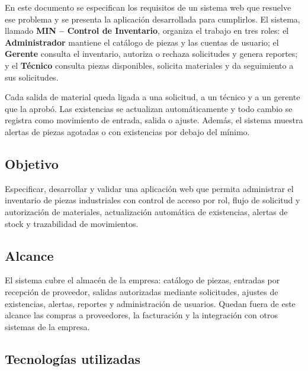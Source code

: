 \documentclass[12pt,letterpaper]{article}
\begin{document}
En este documento se especifican los requisitos de un sistema web que resuelve ese problema y se presenta la aplicación desarrollada para cumplirlos. El sistema, llamado \textbf{MIN – Control de Inventario}, organiza el trabajo en tres roles: el \textbf{Administrador} mantiene el catálogo de piezas y las cuentas de usuario; el \textbf{Gerente} consulta el inventario, autoriza o rechaza solicitudes y genera reportes; y el \textbf{Técnico} consulta piezas disponibles, solicita materiales y da seguimiento a sus solicitudes.

Cada salida de material queda ligada a una solicitud, a un técnico y a un gerente que la aprobó. Las existencias se actualizan automáticamente y todo cambio se registra como movimiento de entrada, salida o ajuste. Además, el sistema muestra alertas de piezas agotadas o con existencias por debajo del mínimo.

\subsection{Objetivo}

Especificar, desarrollar y validar una aplicación web que permita administrar el inventario de piezas industriales con control de acceso por rol, flujo de solicitud y autorización de materiales, actualización automática de existencias, alertas de stock y trazabilidad de movimientos.

\subsection{Alcance}

El sistema cubre el almacén de la empresa: catálogo de piezas, entradas por recepción de proveedor, salidas autorizadas mediante solicitudes, ajustes de existencias, alertas, reportes y administración de usuarios. Quedan fuera de este alcance las compras a proveedores, la facturación y la integración con otros sistemas de la empresa.

\subsection{Tecnologías utilizadas}
\end{document}
